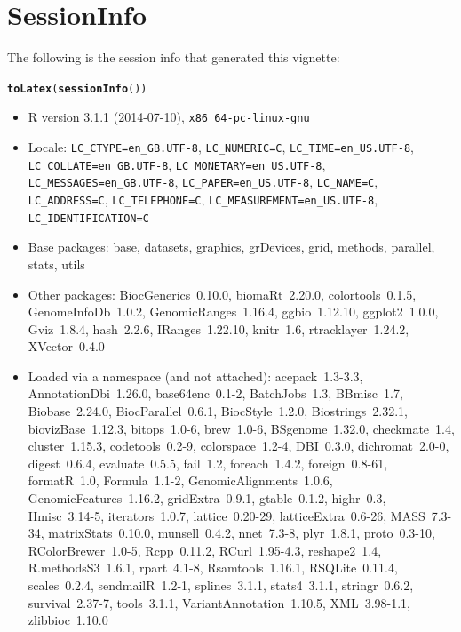 \documentclass[11pt]{article}\usepackage[]{graphicx}\usepackage[usenames,dvipsnames]{color}
\makeatletter
\newcommand{\hlstd}[1]{\textcolor[rgb]{0.345,0.345,0.345}{#1}}%
\newcommand{\hlkwd}[1]{\textcolor[rgb]{0.737,0.353,0.396}{\textbf{#1}}}%
\newenvironment{kframe}{%
 \def\at@end@of@kframe{}%
 \ifinner\ifhmode%
  \def\at@end@of@kframe{\end{minipage}}%
  \begin{minipage}{\columnwidth}%
 \fi\fi%
 \def\FrameCommand##1{\hskip\@totalleftmargin \hskip-\fboxsep
 \colorbox{shadecolor}{##1}\hskip-\fboxsep
     \hskip-\linewidth \hskip-\@totalleftmargin \hskip\columnwidth}%
 \MakeFramed {\advance\hsize-\width
   \@totalleftmargin\z@ \linewidth\hsize
   \@setminipage}}%
 {\par\unskip\endMakeFramed%
 \at@end@of@kframe}
\makeatother
\begin{document}
\section*{SessionInfo}
The following is the session info that generated this vignette:
\begin{kframe}
\begin{alltt}
\hlkwd{toLatex}\hlstd{(}\hlkwd{sessionInfo}\hlstd{())}
\end{alltt}
\end{kframe}\begin{itemize}\raggedright
  \item R version 3.1.1 (2014-07-10), \verb|x86_64-pc-linux-gnu|
  \item Locale: \verb|LC_CTYPE=en_GB.UTF-8|, \verb|LC_NUMERIC=C|, \verb|LC_TIME=en_US.UTF-8|, \verb|LC_COLLATE=en_GB.UTF-8|, \verb|LC_MONETARY=en_US.UTF-8|, \verb|LC_MESSAGES=en_GB.UTF-8|, \verb|LC_PAPER=en_US.UTF-8|, \verb|LC_NAME=C|, \verb|LC_ADDRESS=C|, \verb|LC_TELEPHONE=C|, \verb|LC_MEASUREMENT=en_US.UTF-8|, \verb|LC_IDENTIFICATION=C|
  \item Base packages: base, datasets, graphics, grDevices, grid, methods,
    parallel, stats, utils
  \item Other packages: BiocGenerics~0.10.0, biomaRt~2.20.0, colortools~0.1.5,
    GenomeInfoDb~1.0.2, GenomicRanges~1.16.4, ggbio~1.12.10, ggplot2~1.0.0,
    Gviz~1.8.4, hash~2.2.6, IRanges~1.22.10, knitr~1.6, rtracklayer~1.24.2,
    XVector~0.4.0
  \item Loaded via a namespace (and not attached): acepack~1.3-3.3,
    AnnotationDbi~1.26.0, base64enc~0.1-2, BatchJobs~1.3, BBmisc~1.7,
    Biobase~2.24.0, BiocParallel~0.6.1, BiocStyle~1.2.0, Biostrings~2.32.1,
    biovizBase~1.12.3, bitops~1.0-6, brew~1.0-6, BSgenome~1.32.0, checkmate~1.4,
    cluster~1.15.3, codetools~0.2-9, colorspace~1.2-4, DBI~0.3.0,
    dichromat~2.0-0, digest~0.6.4, evaluate~0.5.5, fail~1.2, foreach~1.4.2,
    foreign~0.8-61, formatR~1.0, Formula~1.1-2, GenomicAlignments~1.0.6,
    GenomicFeatures~1.16.2, gridExtra~0.9.1, gtable~0.1.2, highr~0.3,
    Hmisc~3.14-5, iterators~1.0.7, lattice~0.20-29, latticeExtra~0.6-26,
    MASS~7.3-34, matrixStats~0.10.0, munsell~0.4.2, nnet~7.3-8, plyr~1.8.1,
    proto~0.3-10, RColorBrewer~1.0-5, Rcpp~0.11.2, RCurl~1.95-4.3, reshape2~1.4,
    R.methodsS3~1.6.1, rpart~4.1-8, Rsamtools~1.16.1, RSQLite~0.11.4,
    scales~0.2.4, sendmailR~1.2-1, splines~3.1.1, stats4~3.1.1, stringr~0.6.2,
    survival~2.37-7, tools~3.1.1, VariantAnnotation~1.10.5, XML~3.98-1.1,
    zlibbioc~1.10.0
\end{itemize}
\end{document}
